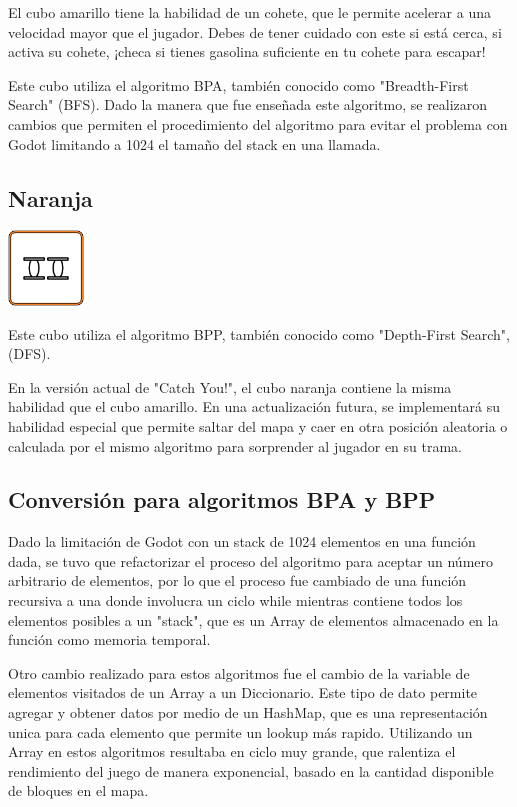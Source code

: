 \documentclass{article}
\begin{document}
El cubo amarillo tiene la habilidad de un cohete, que le permite acelerar a una velocidad mayor que el jugador.
Debes de tener cuidado con este si está cerca, si activa su cohete, ¡checa si tienes gasolina suficiente en tu cohete para escapar!

Este cubo utiliza el algoritmo BPA, también conocido como "Breadth-First Search" (BFS).
Dado la manera que fue enseñada este algoritmo, se realizaron cambios que permiten el procedimiento del algoritmo para evitar el problema
con Godot limitando a 1024 el tamaño del stack en una llamada.



\subsection{Naranja}

\includegraphics[width = 20mm]{_enem-naranja.png}

Este cubo utiliza el algoritmo BPP, también conocido como "Depth-First Search", (DFS).

En la versión actual de "Catch You!", el cubo naranja contiene la misma habilidad que el cubo amarillo.
En una actualización futura, se implementará su habilidad especial que permite saltar del mapa y caer en otra posición
aleatoria o calculada por el mismo algoritmo para sorprender al jugador en su trama.



\subsection{Conversión para algoritmos BPA y BPP}

Dado la limitación de Godot con un stack de 1024 elementos en una función dada, se tuvo que refactorizar el proceso del algoritmo
para aceptar un número arbitrario de elementos, por lo que el proceso fue cambiado de una función recursiva a una donde involucra un
ciclo while mientras contiene todos los elementos posibles a un "stack", que es un Array de elementos almacenado en la función como memoria
temporal.

Otro cambio realizado para estos algoritmos fue el cambio de la variable de elementos visitados de un Array a un Diccionario. Este tipo de dato
permite agregar y obtener datos por medio de un HashMap, que es una representación unica para cada elemento que permite un lookup más rapido.
Utilizando un Array en estos algoritmos resultaba en ciclo muy grande, que ralentiza el rendimiento del juego de manera exponencial, basado en la cantidad
disponible de bloques en el mapa.
\end{document}
